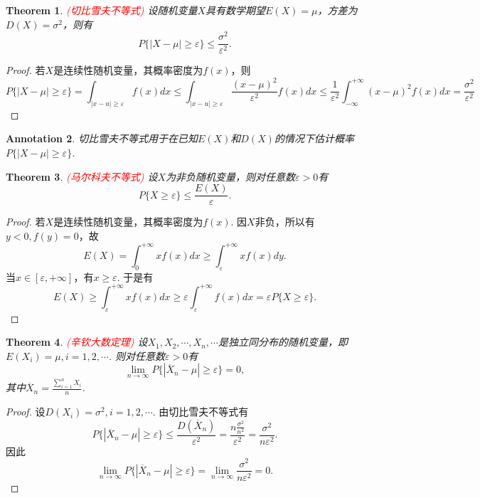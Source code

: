 \documentclass{article}
\newtheorem{theorem}{Theorem}[section]
\newtheorem{annotation}[theorem]{Annotation}
\newcommand{\redt}[1]{\textcolor{red}{#1}}
\begin{document}
\begin{theorem}
\rm \redt{(切比雪夫不等式)} 设随机变量$X$具有数学期望$E(X)=\mu$，方差为$D(X) = \sigma^2$，则有
$$
P\{|X-\mu| \geq \varepsilon \} \leq \frac{\sigma^2}{\varepsilon^2}. 
$$
\end{theorem}

\begin{proof}
若$X$是连续性随机变量，其概率密度为$f(x)$，则
$$
P\{|X-\mu| \geq \varepsilon \} = \int_{|x-u| \geq \varepsilon} f(x)dx \leq \int_{|x-u| \geq \varepsilon} \frac{(x-\mu)^2}{\varepsilon^2}f(x)dx \leq \frac{1}{\varepsilon^2}\int_{-\infty}^{+\infty}(x-\mu)^2f(x)dx =\frac{\sigma^2}{\varepsilon^2}
$$
\end{proof}

\begin{annotation}
\rm 切比雪夫不等式用于在已知$E(X)$和$D(X)$的情况下估计概率$P\{|X-\mu|\geq \varepsilon\}$. 
\end{annotation}

\begin{theorem}
\rm \redt{(马尔科夫不等式)} 设$X$为非负随机变量，则对任意数$\varepsilon > 0$有
$$
P\{X \geq \varepsilon\} \leq \frac{E(X)}{\varepsilon}.
$$
\end{theorem}

\begin{proof}
若$X$是连续性随机变量，其概率密度为$f(x)$. 因$X$非负，所以有$y < 0,f(y)=0$，故
$$
E(X) = \int_{0}^{+\infty} xf(x)dx \geq  \int_{\varepsilon}^{+\infty} xf(x)dy.
$$
当$x \in [\varepsilon,+\infty]$，有$x \geq \varepsilon$. 于是有
$$
E(X) \geq \int_{\varepsilon}^{+\infty} xf(x)dx \geq \varepsilon \int_{\varepsilon}^{+\infty}f(x)dx = \varepsilon P\{X \geq \varepsilon\}.
$$
\end{proof}

\begin{theorem}
\rm \redt{(辛钦大数定理)} 设$X_1,X_2,\cdots,X_n,\cdots$是独立同分布的随机变量，即$E(X_i) = \mu,i=1,2,\cdots$. 则对任意数$\varepsilon > 0$有
$$
\lim\limits_{n \rightarrow \infty}P\{|\overline{X}_n -\mu| \geq \varepsilon\} = 0,
$$ 
其中$\overline{X}_n = \frac{\sum\limits_{i=1}^n X_i}{n}$. 
\end{theorem}

\begin{proof}
设$D(X_i) = \sigma^2, i =1,2,\cdots$. 由切比雪夫不等式有
$$
P\{|\overline{X}_n -\mu| \geq \varepsilon\} \leq \frac{D(\overline{X}_n)}{\varepsilon^2} = \frac{n\frac{\sigma^2}{n^2}}{\varepsilon^2} = \frac{\sigma^2}{n\varepsilon^2}. 
$$
因此
$$
\lim\limits_{n \rightarrow \infty} P\{|\overline{X}_n -\mu| \geq \varepsilon\} = \lim\limits_{n \rightarrow \infty} \frac{\sigma^2}{n\varepsilon^2} = 0.
$$
\end{proof}
\end{document}

